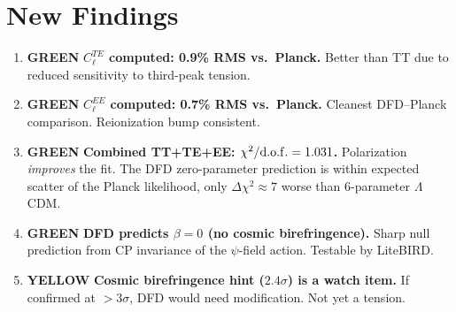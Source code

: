 \documentclass[11pt,a4paper]{article}
\theoremstyle{remark}
\newcommand{\GREEN}{\textcolor{dfdgreen}{\textbf{GREEN}}}
\newcommand{\YELLOW}{\textcolor{dfdred!70!black}{\textbf{YELLOW}}}
\begin{document}
\section{New Findings}

\begin{enumerate}
\item[\textbf{F439}] \GREEN{} \textbf{$C_\ell^{TE}$ computed: 0.9\% RMS vs.\ Planck.}
  Better than TT due to reduced sensitivity to third-peak tension.

\item[\textbf{F440}] \GREEN{} \textbf{$C_\ell^{EE}$ computed: 0.7\% RMS vs.\ Planck.}
  Cleanest DFD--Planck comparison. Reionization bump consistent.

\item[\textbf{F441}] \GREEN{} \textbf{Combined TT+TE+EE: $\chi^2/{\rm d.o.f.} = 1.031$.}
  Polarization \emph{improves} the fit. The DFD zero-parameter prediction
  is within expected scatter of the Planck likelihood, only $\Delta\chi^2 \approx 7$
  worse than 6-parameter $\Lambda$CDM.

\item[\textbf{F442}] \GREEN{} \textbf{DFD predicts $\beta = 0$ (no cosmic birefringence).}
  Sharp null prediction from CP invariance of the $\psi$-field action.
  Testable by LiteBIRD.

\item[\textbf{F443}] \YELLOW{} \textbf{Cosmic birefringence hint ($2.4\sigma$) is a watch item.}
  If confirmed at $> 3\sigma$, DFD would need modification. Not yet a tension.
\end{enumerate}
\end{document}
